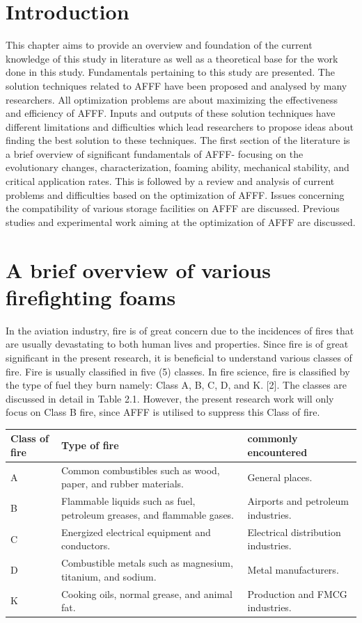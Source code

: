 \documentclass[12pt]{report}
\begin{document}
\section{Introduction}
This chapter aims to provide an overview and foundation of the current knowledge of this study in literature as well as a theoretical base for the work done in this study. Fundamentals pertaining to this study are presented. The solution techniques related to AFFF have been proposed and analysed by many researchers. All optimization problems are about maximizing the effectiveness and efficiency of AFFF. Inputs and outputs of these solution techniques have different limitations and difficulties which lead researchers to propose ideas about finding the best solution to these techniques.
The first section of the literature is a brief overview of significant fundamentals of AFFF- focusing on the evolutionary changes, characterization, foaming ability, mechanical stability, and critical application rates. This is followed by a review and analysis of current problems and difficulties based on the optimization of AFFF. Issues concerning the compatibility of various storage facilities on AFFF are discussed. Previous studies and experimental work aiming at the optimization of AFFF are discussed.

\section{A brief overview of various firefighting foams}
In the aviation industry, fire is of great concern due to the incidences of fires that are usually devastating to both human lives and properties. Since fire is of great significant in the present research, it is beneficial to understand various classes of fire. Fire is usually classified in five (5) classes. In fire science, fire is classified by the type of fuel they burn namely: Class A, B, C, D, and K. [2].  The classes are discussed in detail in Table 2.1. However, the present research work will only focus on Class B fire, since AFFF is utilised to suppress this Class of fire.

\begin{center}
\begin{tabular}{ m{} m{} m{} }
\hline
Class of fire & Type of fire & commonly encountered \\ 
\hline
A & Common combustibles such as wood, paper, and rubber materials. & General places. \\
B & Flammable liquids such as fuel, petroleum greases, and flammable gases. & Airports and petroleum industries. \\
C & Energized electrical equipment and conductors. & Electrical distribution industries. \\
D & Combustible metals such as magnesium, titanium, and sodium. & Metal manufacturers. \\ 
K & Cooking oils, normal grease, and animal fat. & Production and FMCG industries. \\
\hline
\end{tabular}
\end{center}
\end{document}
